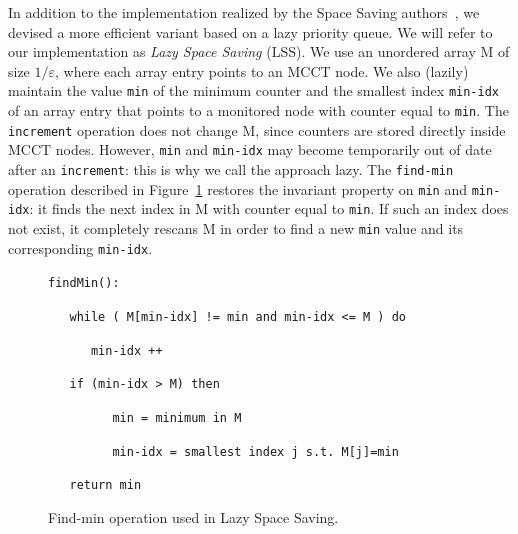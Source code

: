 \documentclass[preprint]{sigplanconf}
\begin{document}
In addition to the implementation realized by the Space Saving authors~\cite{MAA06}, we devised a more efficient variant based on a lazy priority queue. We will refer to our implementation as {\em Lazy Space Saving} (LSS). We use an unordered array M of size $1/\varepsilon$, where each array entry points to an MCCT node. We also (lazily) maintain the value {\tt min} of the minimum counter and the smallest index {\tt min-idx} of an array entry that points to a monitored node with counter equal to {\tt min}. The {\tt increment} operation does not change M, since counters are stored directly inside MCCT nodes. However, {\tt min} and {\tt min-idx} may become temporarily out of date after an {\tt increment}: this is why we call the approach lazy. The {\tt find-min} operation described in Figure~\ref{fig:findMin} restores the invariant property on {\tt min} and {\tt min-idx}: it finds the next index in M with counter equal to {\tt min}. If such an index does not exist, it completely rescans M in order to find a new {\tt min} value and its corresponding {\tt min-idx}.


\begin{figure}[t]
\begin{small}
\verb|findMin():|

\verb|   while ( M[min-idx] != min and min-idx <= M ) do |

\verb|      min-idx ++|

\verb|   if (min-idx > M) then |

\verb|         min = minimum in M|

\verb|         min-idx = smallest index j s.t. M[j]=min |

\verb|   return min|
\end{small}
\caption{Find-min operation used in Lazy Space Saving.}
\label{fig:findMin}
\end{figure} 
\end{document}

